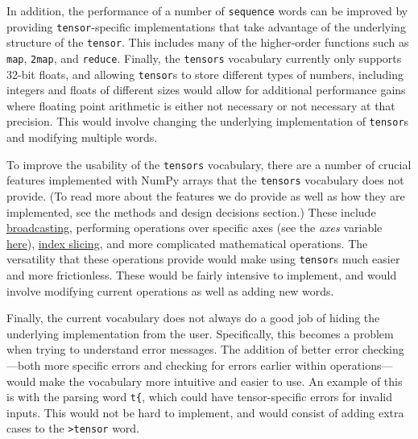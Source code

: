 \documentclass[
]{article}
\begin{document}
In addition, the performance of a number of \texttt{sequence} words can
be improved by providing \texttt{tensor}-specific implementations that
take advantage of the underlying structure of the \texttt{tensor}. This
includes many of the higher-order functions such as \texttt{map},
\texttt{2map}, and \texttt{reduce}. Finally, the \texttt{tensors}
vocabulary currently only supports 32-bit floats, and allowing
\texttt{tensor}s to store different types of numbers, including integers
and floats of different sizes would allow for additional performance
gains where floating point arithmetic is either not necessary or not
necessary at that precision. This would involve changing the underlying
implementation of \texttt{tensor}s and modifying multiple words.

To improve the usability of the \texttt{tensors} vocabulary, there are a
number of crucial features implemented with NumPy arrays that the
\texttt{tensors} vocabulary does not provide. (To read more about the
features we do provide as well as how they are implemented, see the
methods and design decisions section.) These include
\href{https://docs.scipy.org/doc/numpy/user/basics.broadcasting.html}{broadcasting},
performing operations over specific axes (see the \emph{axes} variable
\href{https://numpy.org/doc/stable/reference/generated/numpy.transpose.html}{here}),
\href{https://numpy.org/doc/stable/reference/arrays.indexing.html}{index
slicing}, and more complicated mathematical operations. The versatility
that these operations provide would make using \texttt{tensor}s much
easier and more frictionless. These would be fairly intensive to
implement, and would involve modifying current operations as well as
adding new words.

Finally, the current vocabulary does not always do a good job of hiding
the underlying implementation from the user. Specifically, this becomes
a problem when trying to understand error messages. The addition of
better error checking---both more specific errors and checking for
errors earlier within operations---would make the vocabulary more
intuitive and easier to use. An example of this is with the parsing word
\texttt{t\{}, which could have tensor-specific errors for invalid
inputs. This would not be hard to implement, and would consist of adding
extra cases to the \texttt{\textgreater{}tensor} word.
\end{document}
